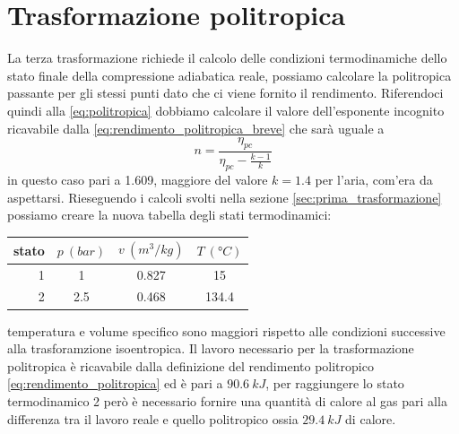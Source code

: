 \documentclass[a4paper,12pt]{article}
\begin{document}
\section{Trasformazione politropica}
\label{sec:terza_trasformazione}
La terza trasformazione richiede il calcolo delle condizioni termodinamiche dello stato finale della
compressione adiabatica reale, possiamo calcolare la politropica passante per gli stessi punti dato che
ci viene fornito il rendimento.
Riferendoci quindi alla \eqref{eq:politropica} dobbiamo calcolare il valore dell'esponente incognito
ricavabile dalla \eqref{eq:rendimento_politropica_breve} che sarà uguale a
\begin{equation}
    \label{eq:esp_politropica}
    n = \frac{\eta_{pc}}{\eta_{pc}-\displaystyle\frac{k-1}{k}}
\end{equation}
in questo caso pari a 1.609, maggiore del valore $k = 1.4$ per l'aria, com'era da aspettarsi.
Rieseguendo i calcoli svolti nella sezione \ref{sec:prima_trasformazione} possiamo creare la nuova tabella
degli stati termodinamici:

\begin{center}
    \begin{tabular}{r|c|c|c}
        stato    & $p\ (bar)$ & $v\ (m^3/kg)$ & $T\ (\text{°}C) $\\ \hline
        1   &           1 &          0.827    &           15     \\ \hline
        2   &         2.5 &          0.468    &           134.4
    \end{tabular}
\end{center}
temperatura e volume specifico sono maggiori rispetto alle condizioni successive alla trasforamzione
isoentropica.
Il lavoro necessario per la trasformazione politropica è ricavabile dalla definizione del rendimento politropico
\eqref{eq:rendimento_politropica} ed è pari a $90.6\ kJ$, per raggiungere lo stato termodinamico 2 però
è necessario fornire una quantità di calore al gas pari alla differenza tra il lavoro reale e quello politropico
ossia $29.4\ kJ$ di calore.
\end{document}
